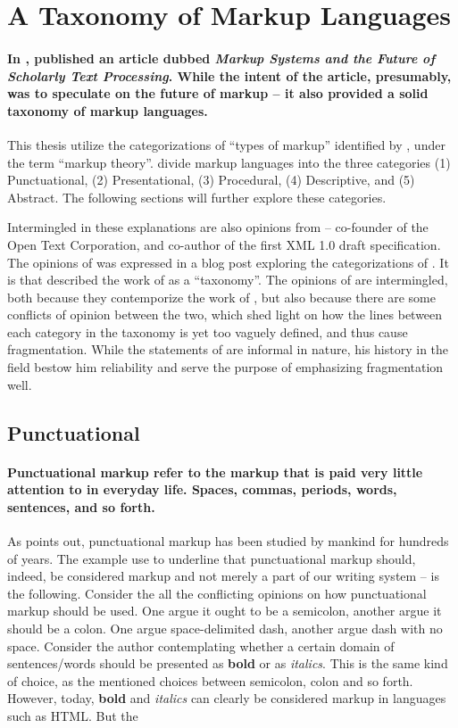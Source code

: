 \documentclass{scrreprt}
\begin{document}
\section{A Taxonomy of Markup Languages}
\label{sec:taxonomy}
\paragraph{In \citeyear{coombs}, \citeauthor*{coombs} published an article dubbed \textit{Markup Systems and the Future of Scholarly Text Processing}. While the intent of the article, presumably, was to speculate on the future of markup -- it also provided a solid taxonomy of markup languages.} This thesis utilize the categorizations of ``types of markup'' identified by \citet{coombs}, under the term ``markup theory''. \citet{coombs} divide markup languages into the three categories (1) Punctuational, (2) Presentational, (3) Procedural, (4) Descriptive, and (5) Abstract. The following sections will further explore these categories.

Intermingled in these explanations are also opinions from \citet{bray} -- co-founder of the Open Text Corporation, and co-author of the first XML 1.0 draft specification. The opinions of \citeauthor{bray} was expressed in a blog post exploring the categorizations of \citet{coombs}. It is \citeauthor{bray} that described the work of \citeauthor{coombs} as a ``taxonomy''. The opinions of \citeauthor{bray} are intermingled, both because they contemporize the work of \citeauthor{coombs}, but also because there are some conflicts of opinion between the two, which shed light on how the lines between each category in the taxonomy is yet too vaguely defined, and thus cause fragmentation. While the statements of \citeauthor{bray} are informal in nature, his history in the field bestow him reliability and serve the purpose of emphasizing fragmentation well. 


\subsection{Punctuational}
\paragraph{Punctuational markup refer to the markup that is paid very little attention to in everyday life. Spaces, commas, periods, words, sentences, and so forth.} As \citet{coombs} points out, punctuational markup has been studied by mankind for hundreds of years. The example \citet{coombs} use to underline that punctuational markup should, indeed, be considered markup and not merely a part of our writing system -- is the following. Consider the all the conflicting opinions on how punctuational markup should be used. One argue it ought to be a  semicolon, another argue it should be a colon. One argue space-delimited dash, another argue dash with no space. Consider the author contemplating whether a certain domain of sentences/words should be presented as \textbf{bold} or as \textit{italics}. This is the same kind of choice, as the mentioned choices between semicolon, colon and so forth. However, today, \textbf{bold} and \textit{italics} can clearly be considered markup in languages such as HTML. But the 
\end{document}
